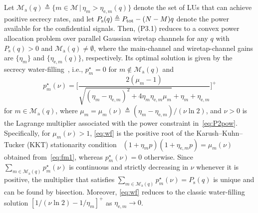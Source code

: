 \documentclass[journal]{IEEEtran}
\newcommand{\rev}[1]{{\color{red}#1}}
\newcommand{\rev}[1]{#1}
\begin{document}
Let $\mathcal M_{\mathrm a}(q)\triangleq\{m\in\mathcal M\,|\,\eta_m>\eta_{\mathrm{e},m}(q)\}$ denote the set of LUs that can achieve positive secrecy rates, and let $P_{\mathrm s}(q)\triangleq P_{\mathrm{tot}}-(N-M)q$ denote the power available for the confidential signals. Then, (P3.1) reduces to a convex power allocation problem over parallel Gaussian wiretap channels for any $q$ with $P_{\mathrm s}(q)>0$ and $\mathcal M_{\mathrm a}(q)\neq\emptyset$, where the main-channel and wiretap-channel gains are $\{\eta_m\}$ and $\{\eta_{\mathrm{e},m}(q)\}$, respectively. Its optimal solution is given by the secrecy water-filling~\cite{Gopala2008,Liang2008}, i.e., $p_m^\star=0$ for $m\notin\mathcal M_{\mathrm a}(q)$ and
\begin{equation}\label{eq:wf}
p_m^\star(\nu)=\bigg[\frac{2(\mu_m-1)}{\sqrt{(\eta_m-\eta_{\mathrm{e},m})^2+4\eta_m\eta_{\mathrm{e},m}\mu_m}+\eta_m+\eta_{\mathrm{e},m}}\bigg]^+
\end{equation}
for $m\in\mathcal M_{\mathrm a}(q)$, where $\mu_m=\mu_m(\nu)\triangleq(\eta_m-\eta_{\mathrm{e},m})/(\nu\ln2)$, and $\nu>0$ is the Lagrange multiplier associated with the power constraint in~\eqref{eq:P2pow}. Specifically, \rev{for $\mu_m(\nu)>1$,} \eqref{eq:wf} is the positive root of the Karush--Kuhn--Tucker (KKT) stationarity condition~\cite{Boyd2004} $(1+\eta_mp)(1+\eta_{\mathrm{e},m}p)=\mu_m(\nu)$ obtained from~\eqref{eq:fm1}\rev{, whereas $p_m^\star(\nu)=0$ otherwise}. Since $\sum_{m\in\mathcal M_{\mathrm a}(q)}p_m^\star(\nu)$ is continuous and strictly decreasing in $\nu$ whenever it is positive, the multiplier that satisfies $\sum_{m\in\mathcal M_{\mathrm a}(q)}p_m^\star(\nu)=P_{\mathrm s}(q)$ is unique and can be found by bisection. Moreover, \eqref{eq:wf} reduces to the classic water-filling solution $[1/(\nu\ln2)-1/\eta_m]^+$ as $\eta_{\mathrm{e},m}\to0$.
\end{document}

